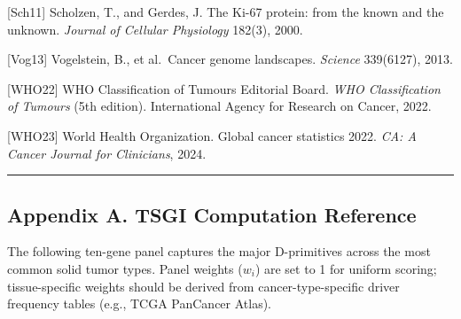 \documentclass[
  11pt,
  letterpaper,
]{article}
\begin{document}
{[}Sch11{]} Scholzen, T., and Gerdes, J. The Ki-67 protein: from the
known and the unknown. \emph{Journal of Cellular Physiology} 182(3),
2000.

{[}Vog13{]} Vogelstein, B., et al.~Cancer genome landscapes.
\emph{Science} 339(6127), 2013.

{[}WHO22{]} WHO Classification of Tumours Editorial Board. \emph{WHO
Classification of Tumours} (5th edition). International Agency for
Research on Cancer, 2022.

{[}WHO23{]} World Health Organization. Global cancer statistics 2022.
\emph{CA: A Cancer Journal for Clinicians}, 2024.

\begin{center}\rule{0.5\linewidth}{0.5pt}\end{center}

\subsection{Appendix A. TSGI Computation
Reference}\label{appendix-a.-tsgi-computation-reference}

The following ten-gene panel captures the major D-primitives across the
most common solid tumor types. Panel weights (\(w_i\)) are set to 1 for
uniform scoring; tissue-specific weights should be derived from
cancer-type-specific driver frequency tables (e.g., TCGA PanCancer
Atlas).
\end{document}
